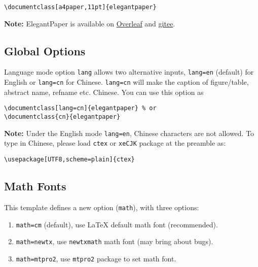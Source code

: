 \documentclass[11pt,en]{elegantpaper}
\begin{document}
\begin{lstlisting}
\documentclass[a4paper,11pt]{elegantpaper}
\end{lstlisting}
\textbf{Note:} ElegantPaper is available on  \href{https://www.overleaf.com/latex/templates/elegantpaper-template/yzghrqjhmmmr}{Overleaf} and \href{https://gitee.com/ElegantLaTeX/ElegantPaper}{gitee}.

\subsection{Global Options}
Language mode option \lstinline{lang} allows two alternative inputs, \lstinline{lang=en} (default)  for English or \lstinline{lang=cn} for Chinese. \lstinline{lang=cn} will make the caption of figure/table, abstract name, refname etc. Chinese. You can use this option as
\begin{lstlisting}
\documentclass[lang=cn]{elegantpaper} % or
\documentclass{cn}{elegantpaper} 
\end{lstlisting}
\textbf{Note:} Under the English mode \lstinline{lang=en}, Chinese characters are not allowed. To type in Chinese, please load  \lstinline{ctex} or \lstinline{xeCJK} package at the preamble as:
\begin{lstlisting}
\usepackage[UTF8,scheme=plain]{ctex}
\end{lstlisting}

\subsection{Math Fonts}

This template defines a new option (\lstinline{math}), with three options:

\begin{enumerate}
  \item \lstinline{math=cm} (default), use \LaTeX{} default math font (recommended).
  \item \lstinline{math=newtx}, use \lstinline{newtxmath} math font (may bring about bugs).
  \item \lstinline{math=mtpro2}, use \lstinline{mtpro2} package to set math font.
\end{enumerate}
\end{document}
